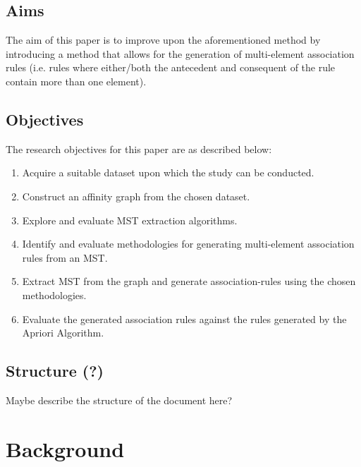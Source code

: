 \documentclass[paper=a4,fontsize=11pt]{report}	%
\begin{document}
\section{Aims}
The aim of this paper is to improve upon the aforementioned method by introducing a method that allows for the generation of multi-element association rules (i.e. rules where either/both the antecedent and consequent of the rule contain more than one element).

\section{Objectives}
The research objectives for this paper are as described below:
\begin{enumerate}
\item Acquire a suitable dataset upon which the study can be conducted.
\item Construct an affinity graph from the chosen dataset.
\item Explore and evaluate MST extraction algorithms.
\item Identify and evaluate methodologies for generating multi-element association rules from an MST.
\item Extract MST from the graph and generate association-rules using the chosen methodologies.
\item Evaluate the generated association rules against the rules generated by the Apriori Algorithm.
\end{enumerate}

\section{Structure (?)}
Maybe describe the structure of the document here?





\chapter{Background}
\end{document}
